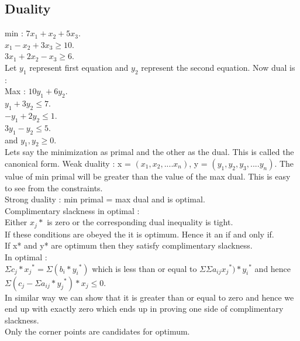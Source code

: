 \documentclass[solution,addpoints,12pt]{exam}
\begin{document}
\subsection{Duality}
min : $7x_1 + x_2 + 5x_3$.\\
$x_1 - x_2 + 3x_3 \ge 10$.\\
$3x_1 + 2x_2 - x_3 \ge 6$.\\
Let $y_1$ represent first equation and $y_2$ represent
the second equation.
Now dual is :\\
Max : $10y_1 + 6y_2$.\\
$y_1 + 3y_2 \le 7$.\\
$-y_1 + 2y_2 \le 1$.\\
$3y_1 - y_2 \le 5$.\\
and $y_1, y_2 \ge 0$.\\

Lets say the minimization as primal and
the other as the dual. This is called the canonical form.
Weak duality : x = $(x_1, x_2, .... x_n)$, y = $(y_1, y_2, y_3, .... y_n)$.
The value of min primal will be greater than the value of the max dual.
This is easy to see from the constraints.\\
Strong duality : min primal = max dual and is optimal.\\
Complimentary slackness in optimal :\\
Either $x_j*$ is zero or the corresponding dual inequality is tight.\\
If these conditions are obeyed the it is optimum.
Hence it an if and only if.\\

If x* and y* are optimum then they satisfy complimentary slackness.\\
In optimal :\\
$\Sigma c_j*{x_j}^* = \Sigma (b_i*{y_i}^*)$
which is less than or equal to $\Sigma \Sigma a_{ij}{x_j}^*)*{y_i}^*$
and hence $\Sigma (c_j - \Sigma a_{ij}*{y_j}^*)*x_j \le 0$.\\
In similar way we can show that it is greater than or equal to zero and
hence we end up with exactly zero which ends up in proving one side
of complimentary slackness.\\

Only the corner points are candidates for optimum.
\end{document}

